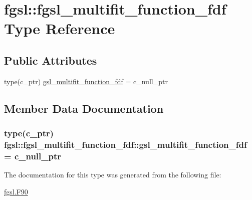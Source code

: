 \hypertarget{structfgsl_1_1fgsl__multifit__function__fdf}{}\section{fgsl\+:\+:fgsl\+\_\+multifit\+\_\+function\+\_\+fdf Type Reference}
\label{structfgsl_1_1fgsl__multifit__function__fdf}
\subsection*{Public Attributes}
\begin{DoxyCompactItemize}
\item 
type(c\+\_\+ptr) \hyperlink{structfgsl_1_1fgsl__multifit__function__fdf_ab4186965275ddc26ff9a3ecd7641e625}{gsl\+\_\+multifit\+\_\+function\+\_\+fdf} = c\+\_\+null\+\_\+ptr
\end{DoxyCompactItemize}


\subsection{Member Data Documentation}
\hypertarget{structfgsl_1_1fgsl__multifit__function__fdf_ab4186965275ddc26ff9a3ecd7641e625}{}
\subsubsection[{gsl\+\_\+multifit\+\_\+function\+\_\+fdf}]{\setlength{\rightskip}{0pt plus 5cm}type(c\+\_\+ptr) fgsl\+::fgsl\+\_\+multifit\+\_\+function\+\_\+fdf\+::gsl\+\_\+multifit\+\_\+function\+\_\+fdf = c\+\_\+null\+\_\+ptr}\label{structfgsl_1_1fgsl__multifit__function__fdf_ab4186965275ddc26ff9a3ecd7641e625}


The documentation for this type was generated from the following file\+:\begin{DoxyCompactItemize}
\item 
\hyperlink{fgsl_8F90}{fgsl.\+F90}\end{DoxyCompactItemize}
